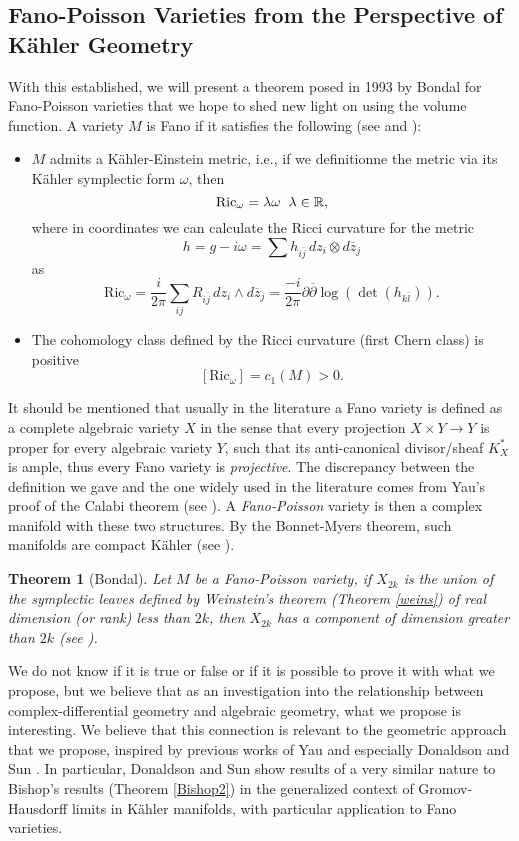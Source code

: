 \documentclass[12pt,twoside,a4paper]{report}
\newtheorem{theorem}{Theorem}[section]
\newcommand{\re}{\ensuremath{\mathbb R }}
\begin{document}
\subsection{Fano-Poisson Varieties from the Perspective of Kähler Geometry}
\noindent With this established, we will present a theorem posed in 1993 by Bondal for Fano-Poisson varieties that we hope to shed new light on using the volume function. A variety $M$ is Fano if it satisfies the following
(see \cite{S-Yau} and \cite{ZB}):
\begin{itemize}
        \item $M$ admits a Kähler-Einstein metric, i.e., if we definitionne the metric via its Kähler symplectic form
        $\omega$, then
                $$\textrm{Ric}_{\omega}=\lambda\omega\hspace{0.2cm}\lambda\in\re,$$
        where in coordinates we can calculate the Ricci curvature for the metric
        \[
        h=g-i\omega=\sum h_{i\overline{j}}\,dz_i\otimes d\overline{z}_{j}
        \]
        as
        \[
        \textrm{Ric}_{\omega}=\frac{i}{2\pi}\sum_{ij}R_{i\overline{j}}\,dz_i\wedge d\overline{z}_j=\frac{-i}{2\pi}\partial\overline{\partial}\log(\det(h_{k\overline{l}})).
        \]
        \item The cohomology class defined by the Ricci curvature (first Chern class) is positive
        \[
        [\textrm{Ric}_{\omega}]=c_1(M)>0.
        \]
\end{itemize}
\noindent It should be mentioned that usually in the literature a Fano variety is defined as a complete algebraic variety $X$
in the sense that every projection $X\times Y\rightarrow Y$ is proper for every algebraic variety $Y$, such that its anti-canonical divisor/sheaf
$K^{*}_{X}$ is ample, thus every Fano variety is \emph{projective}. The discrepancy between the definition we gave and the one widely used in
the literature comes from Yau's proof of the Calabi theorem (see \cite{S-Yau}). A
\emph{Fano-Poisson} variety is then a complex manifold with these two structures. By the Bonnet-Myers theorem, such manifolds
are compact Kähler (see \cite{Myers}).
\begin{theorem}[Bondal]\label{Bondal}
  Let $M$ be a Fano-Poisson variety, if $X_{2k}$ is the union of the symplectic leaves defined by Weinstein's theorem (Theorem \ref{weins})
  of real dimension (or rank) less than $2k$, then $X_{2k}$ has a component of dimension greater than $2k$ (see \cite{Bondal}).
\end{theorem}
\noindent We do not know if it is true or false or if it is possible to prove it with what we propose, but we believe that as an
investigation into the relationship between complex-differential geometry and algebraic geometry, what we propose is interesting.
We believe that this connection is relevant to the geometric approach that we propose, inspired by previous works
of Yau \cite{S-Yau} and especially Donaldson and Sun \cite{D-SS}. In particular, Donaldson and Sun show results of a very similar nature
to Bishop's results (Theorem \ref{Bishop2}) in the generalized context of Gromov-Hausdorff limits in
Kähler manifolds, with particular application to Fano varieties.
\end{document}
